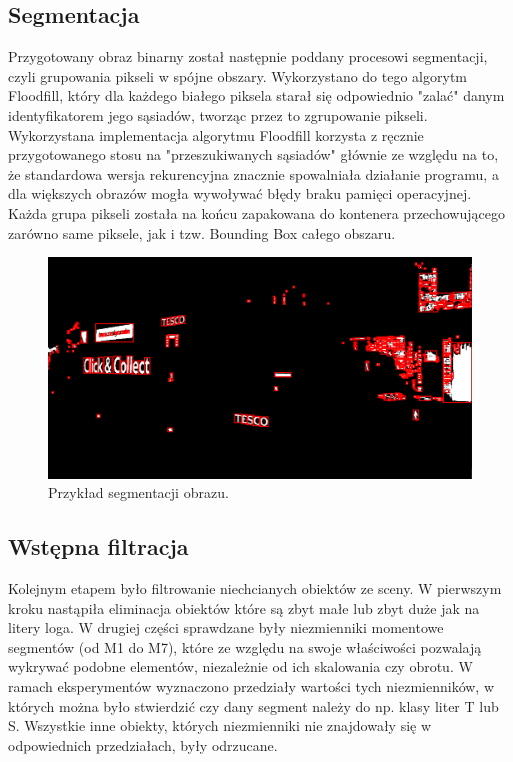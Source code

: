 \documentclass[11pt,a4paper]{article} %
\numberwithin{equation}{section} %
\numberwithin{figure}{section} %
\numberwithin{table}{section} %
\begin{document}
\subsection{Segmentacja}

Przygotowany obraz binarny został następnie poddany procesowi segmentacji, czyli grupowania pikseli w spójne obszary. Wykorzystano do tego algorytm Floodfill, który dla każdego białego piksela starał się odpowiednio "zalać" danym identyfikatorem jego sąsiadów, tworząc przez to zgrupowanie pikseli. Wykorzystana implementacja algorytmu Floodfill korzysta z ręcznie przygotowanego stosu na "przeszukiwanych sąsiadów" głównie ze względu na to, że standardowa wersja rekurencyjna znacznie spowalniała działanie programu, a dla większych obrazów mogła wywoływać błędy braku pamięci operacyjnej. Każda grupa pikseli została na końcu zapakowana do kontenera przechowującego zarówno same piksele, jak i tzw. Bounding Box całego obszaru.

\begin{figure}
	\centering
	\includegraphics[width=14cm]{pobr_proj_seg1.png}
	\caption{Przykład segmentacji obrazu.}
	\label{fig:pobr_proj_seg1}
\end{figure}


\subsection{Wstępna filtracja}

Kolejnym etapem było filtrowanie niechcianych obiektów ze sceny. W pierwszym kroku nastąpiła eliminacja obiektów które są zbyt małe lub zbyt duże jak na litery loga. W drugiej części sprawdzane były niezmienniki momentowe segmentów (od M1 do M7), które ze względu na swoje właściwości pozwalają wykrywać podobne elementów, niezależnie od ich skalowania czy obrotu. W ramach eksperymentów wyznaczono przedziały wartości tych niezmienników, w których można było stwierdzić czy dany segment należy do np. klasy liter T lub S. Wszystkie inne obiekty, których niezmienniki nie znajdowały się w odpowiednich przedziałach, były odrzucane.
\end{document}
